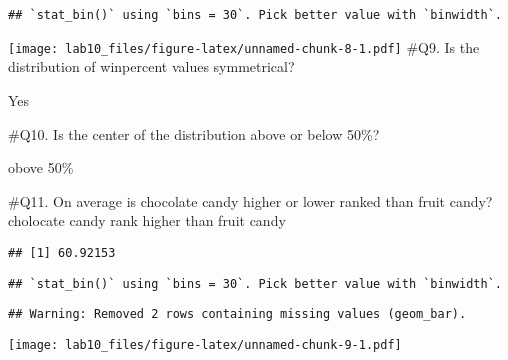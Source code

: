 \documentclass[
]{article}
\newenvironment{Shaded}{\begin{snugshade}}{\end{snugshade}}
\newcommand{\DataTypeTok}[1]{\textcolor[rgb]{0.13,0.29,0.53}{#1}}
\newcommand{\DecValTok}[1]{\textcolor[rgb]{0.00,0.00,0.81}{#1}}
\newcommand{\KeywordTok}[1]{\textcolor[rgb]{0.13,0.29,0.53}{\textbf{#1}}}
\newcommand{\NormalTok}[1]{#1}
\newcommand{\OperatorTok}[1]{\textcolor[rgb]{0.81,0.36,0.00}{\textbf{#1}}}
\newcommand{\StringTok}[1]{\textcolor[rgb]{0.31,0.60,0.02}{#1}}
\begin{document}
\begin{verbatim}
## `stat_bin()` using `bins = 30`. Pick better value with `binwidth`.
\end{verbatim}

\texttt{[image: lab10\_files/figure-latex/unnamed-chunk-8-1.pdf]} \#Q9.
Is the distribution of winpercent values symmetrical?

Yes

\#Q10. Is the center of the distribution above or below 50\%?

obove 50\%

\#Q11. On average is chocolate candy higher or lower ranked than fruit
candy? cholocate candy rank higher than fruit candy

\begin{Shaded}
\end{Shaded}

\begin{verbatim}
## [1] 60.92153
\end{verbatim}

\begin{Shaded}
\end{Shaded}

\begin{verbatim}
## `stat_bin()` using `bins = 30`. Pick better value with `binwidth`.
\end{verbatim}

\begin{verbatim}
## Warning: Removed 2 rows containing missing values (geom_bar).
\end{verbatim}

\texttt{[image: lab10\_files/figure-latex/unnamed-chunk-9-1.pdf]}
\end{document}

